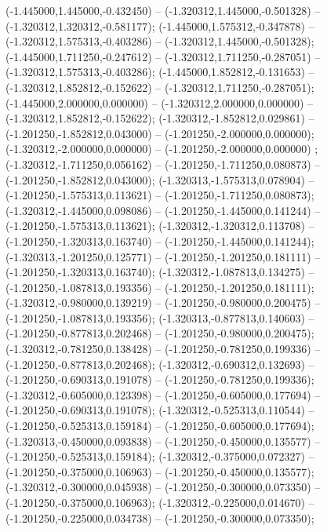  (-1.445000,1.445000,-0.432450) -- (-1.320312,1.445000,-0.501328) -- (-1.320312,1.320312,-0.581177);
 (-1.445000,1.575312,-0.347878) -- (-1.320312,1.575313,-0.403286) -- (-1.320312,1.445000,-0.501328);
 (-1.445000,1.711250,-0.247612) -- (-1.320312,1.711250,-0.287051) -- (-1.320312,1.575313,-0.403286);
 (-1.445000,1.852812,-0.131653) -- (-1.320312,1.852812,-0.152622) -- (-1.320312,1.711250,-0.287051);
 (-1.445000,2.000000,0.000000) -- (-1.320312,2.000000,0.000000) -- (-1.320312,1.852812,-0.152622);
 (-1.320312,-1.852812,0.029861) -- (-1.201250,-1.852812,0.043000) -- (-1.201250,-2.000000,0.000000);
 (-1.320312,-2.000000,0.000000) -- (-1.201250,-2.000000,0.000000) ;
 (-1.320312,-1.711250,0.056162) -- (-1.201250,-1.711250,0.080873) -- (-1.201250,-1.852812,0.043000);
 (-1.320313,-1.575313,0.078904) -- (-1.201250,-1.575313,0.113621) -- (-1.201250,-1.711250,0.080873);
 (-1.320312,-1.445000,0.098086) -- (-1.201250,-1.445000,0.141244) -- (-1.201250,-1.575313,0.113621);
 (-1.320312,-1.320312,0.113708) -- (-1.201250,-1.320313,0.163740) -- (-1.201250,-1.445000,0.141244);
 (-1.320313,-1.201250,0.125771) -- (-1.201250,-1.201250,0.181111) -- (-1.201250,-1.320313,0.163740);
 (-1.320312,-1.087813,0.134275) -- (-1.201250,-1.087813,0.193356) -- (-1.201250,-1.201250,0.181111);
 (-1.320312,-0.980000,0.139219) -- (-1.201250,-0.980000,0.200475) -- (-1.201250,-1.087813,0.193356);
 (-1.320313,-0.877813,0.140603) -- (-1.201250,-0.877813,0.202468) -- (-1.201250,-0.980000,0.200475);
 (-1.320312,-0.781250,0.138428) -- (-1.201250,-0.781250,0.199336) -- (-1.201250,-0.877813,0.202468);
 (-1.320312,-0.690312,0.132693) -- (-1.201250,-0.690313,0.191078) -- (-1.201250,-0.781250,0.199336);
 (-1.320312,-0.605000,0.123398) -- (-1.201250,-0.605000,0.177694) -- (-1.201250,-0.690313,0.191078);
 (-1.320312,-0.525313,0.110544) -- (-1.201250,-0.525313,0.159184) -- (-1.201250,-0.605000,0.177694);
 (-1.320313,-0.450000,0.093838) -- (-1.201250,-0.450000,0.135577) -- (-1.201250,-0.525313,0.159184);
 (-1.320312,-0.375000,0.072327) -- (-1.201250,-0.375000,0.106963) -- (-1.201250,-0.450000,0.135577);
 (-1.320312,-0.300000,0.045938) -- (-1.201250,-0.300000,0.073350) -- (-1.201250,-0.375000,0.106963);
 (-1.320312,-0.225000,0.014670) -- (-1.201250,-0.225000,0.034738) -- (-1.201250,-0.300000,0.073350);
